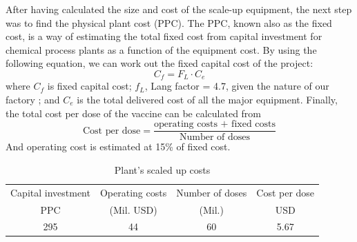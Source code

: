 After having calculated the size and cost of the scale-up equipment, the next step was to find the physical plant cost (PPC). The PPC, known also as the fixed cost, is a way of estimating the total fixed cost from capital investment for chemical process plants as a function of the equipment cost. By using the following equation, we can work out the fixed capital cost of the project: 
\begin{equation}
    C_f = F_L \cdot C_e
\end{equation}
where $C_f$ is fixed capital cost; $f_L$, Lang factor = 4.7, given the nature of our factory \cite{SinnottR.K2005CRc}; and $C_e$ is the total delivered cost of all the major equipment.
Finally, the total cost per dose of the vaccine can be calculated from
\begin{equation}
    \text{Cost per dose} = \frac{\text{operating costs + fixed costs}}{\text{Number of doses}}
\end{equation}
And operating cost is estimated at 15\% of fixed cost.

\begin{table}[h]
    \centering
    \begin{tabular}{cccc}
    \toprule
    Capital investment & Operating costs & Number of doses & Cost per dose\\
    PPC & (Mil. USD) & (Mil.) & USD \\
    \midrule
    295 & 44 & 60 & 5.67 \\ 
    \bottomrule
    \end{tabular}
    \caption{Plant's scaled up costs}
\end{table}